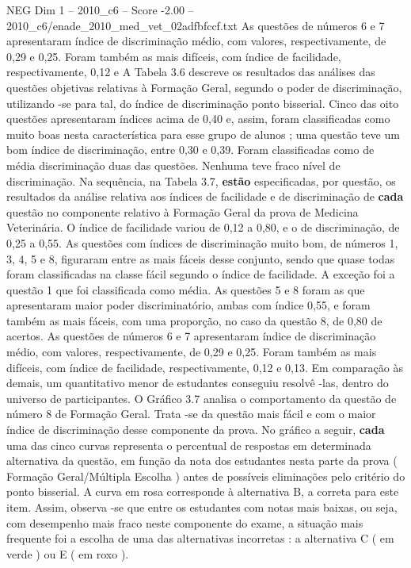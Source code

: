\begin{textsample}{NEG Dim 1 – 2010\_c6 – Score -2.00 – 2010\_c6/enade\_2010\_med\_vet\_02adfbfccf.txt}
As questões de números 6 e 7 apresentaram índice de discriminação médio, com valores, respectivamente, de 0,29 e 0,25.
Foram também as mais difíceis, com índice de facilidade, respectivamente, 0,12 e A Tabela 3.6 descreve os resultados das análises das questões objetivas relativas à Formação Geral, segundo o poder de discriminação, utilizando -se para tal, do índice de discriminação ponto bisserial.
Cinco das oito questões apresentaram índices acima de 0,40 e, assim, foram classificadas como muito boas nesta característica para esse grupo de alunos ; uma questão teve um bom índice de discriminação, entre 0,30 e 0,39.
Foram classificadas como de média discriminação duas das questões.
Nenhuma teve fraco nível de discriminação.
Na sequência, na Tabela 3.7, \textbf{estão} especificadas, por questão, os resultados da análise relativa aos índices de facilidade e de discriminação de \textbf{cada} questão no componente relativo à Formação Geral da prova de Medicina Veterinária.
O índice de facilidade variou de 0,12 a 0,80, e o de discriminação, de 0,25 a 0,55.
As questões com índices de discriminação muito bom, de números 1, 3, 4, 5 e 8, figuraram entre as mais fáceis desse conjunto, sendo que quase todas foram classificadas na classe fácil segundo o índice de facilidade.
A exceção foi a questão 1 que foi classificada como média.
As questões 5 e 8 foram as que apresentaram maior poder discriminatório, ambas com índice 0,55, e foram também as mais fáceis, com uma proporção, no caso da questão 8, de 0,80 de acertos.
As questões de números 6 e 7 apresentaram índice de discriminação médio, com valores, respectivamente, de 0,29 e 0,25.
Foram também as mais difíceis, com índice de facilidade, respectivamente, 0,12 e 0,13.
Em comparação às demais, um quantitativo menor de estudantes conseguiu resolvê -las, dentro do universo de participantes.
O Gráfico 3.7 analisa o comportamento da questão de número 8 de Formação Geral.
Trata -se da questão mais fácil e com o maior índice de discriminação desse componente da prova.
No gráfico a seguir, \textbf{cada} uma das cinco curvas representa o percentual de respostas em determinada alternativa da questão, em função da nota dos estudantes nesta parte da prova ( Formação Geral/Múltipla Escolha ) antes de possíveis eliminações pelo critério do ponto bisserial.
A curva em rosa corresponde à alternativa B, a correta para este item.
Assim, observa -se que entre os estudantes com notas mais baixas, ou seja, com desempenho mais fraco neste componente do exame, a situação mais frequente foi a escolha de uma das alternativas incorretas : a alternativa C ( em verde ) ou E ( em roxo ).

\end{textsample}
